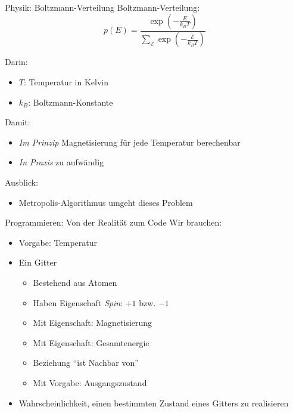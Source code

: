 
\begin{frame}{Physik: Boltzmann-Verteilung}
%
Boltzmann-Verteilung:
\[ p(E) = \frac
	{\exp( -\frac{E}{k_B T} )}
	{\sum_\mathcal{E} \exp( -\frac{\mathcal{E}}{k_B T} )}
\]

Darin:
\begin{itemize}
\item $T$: Temperatur in Kelvin
\item $k_B$: Boltzmann-Konstante
\end{itemize}

Damit:
\begin{itemize}
\item \emph{Im Prinzip} Magnetisierung für jede Temperatur berechenbar
\item \emph{In Praxis} zu aufwändig
\end{itemize}

Ausblick:
\begin{itemize}
\item Metropolis-Algorithmus umgeht dieses Problem
\end{itemize}
%
\end{frame}


\begin{frame}{Programmieren: Von der Realität zum Code}
%
Wir brauchen:
\begin{itemize}
\item Vorgabe: Temperatur
\item Ein Gitter
	\begin{itemize}
	\item Bestehend aus Atomen
	\item Haben Eigenschaft \emph{Spin}: $+1$ bzw. $-1$
	\item Mit Eigenschaft: Magnetisierung
	\item Mit Eigenschaft: Gesamtenergie
	\item Beziehung \enquote{ist Nachbar von}
	\item Mit Vorgabe: Ausgangszustand
	\end{itemize}
\item Wahrscheinlichkeit, einen bestimmten Zustand eines Gitters zu realisieren
\end{itemize}
%
\end{frame}


